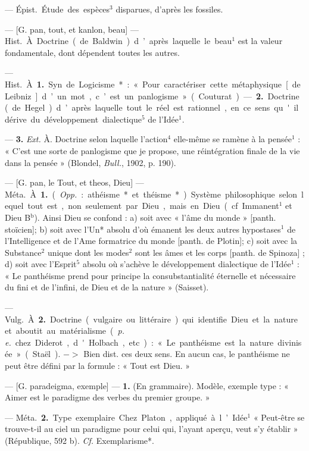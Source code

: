 
	\begin{itemize}[leftmargin=1cm, label=, itemsep=1pt]

 — \si{Épist.} Étude des
espèces$^3$ disparues, d'après les fossiles.

 — [G. pan, tout, et kanlon,
beau] — \si{Hist.} À. Doctrine (de
Baldwin) d’après laquelle le beau$^1$
est la valeur fondamentale, dont
dépendent toutes les autres.

 — \si{Hist.} À. {\bf 1.} Syn. de
Logicisme* : « Pour caractériser cette
métaphysique [de Leibniz] d’un mot,
c’est un panlogisme » (Couturat). —
 {\bf 2.} Doctrine (de Hegel) d’après laquelle tout le réel est rationnel, en
ce sens qu'il dérive du développement dialectique$^5$ de l’Idée$^1$.

— {\bf 3.} {\it Ext.} À. Doctrine selon laquelle l’action$^4$ elle-même se ramène
à la pensée$^1$ : « C’est une sorte de
panlogisme que je propose, une
réintégration finale de la vie dans
la pensée » (Blondel, {\it Bull.}, 1902,
p. 190).

 — [G. pan, le Tout, et theos,
Dieu] — \si{Méta.} À. {\bf 1.} ({\it Opp.} : athéisme* et théisme*). Système philosophique selon lequel tout est, non
seulement par Dieu, mais en Dieu
(cf. Immanent$^1$ et Dieu B$^\text{b}$). Ainsi
Dieu se confond : a) soit avec « l'âme
du monde » [panth. stoïcien]; b) soit
avec l’Un* absolu d’où émanent les
deux autres hypostases$^1$ de l’Intelligence et de l’Ame formatrice du
monde [panth. de Plotin]; c) soit
avec la Substance$^2$ unique dont les
modes$^2$ sont les âmes et les corps
[panth. de Spinoza] ; d) soit avec
l'Esprit$^5$ absolu où s'achève le développement dialectique de l’Idée$^1$ :
« Le panthéisme prend pour principe la consubstantialité éternelle et
nécessaire du fini et de l'infini, de
Dieu et de la nature » (Saisset).

— \si{Vulg.} À. {\bf 2.} Doctrine (vulgaire
ou littéraire) qui identifie Dieu et la
nature et aboutit au matérialisme
({\it p. e.} chez Diderot, d'Holbach, etc.) :
« Le panthéisme est la nature divinisée » (Staël). $->$ Bien dist. ces
deux sens. En aucun cas, le panthéisme ne peut être défini par la
formule : « Tout est Dieu. »

 — [G. paradeigma, exemple]
— {\bf 1.} (En grammaire). Modèle,
exemple type : « Aimer est le paradigme des verbes du premier
groupe. »

— \si{Méta.} {\bf 2.} Type exemplaire.
Chez Platon, appliqué à l’Idée$^1$
« Peut-être se trouve-t-il au ciel un
paradigme pour celui qui, l'ayant
aperçu, veut s'y établir » (République, 592 b). {\it Cf.} Exemplarisme*.


\end{itemize}
